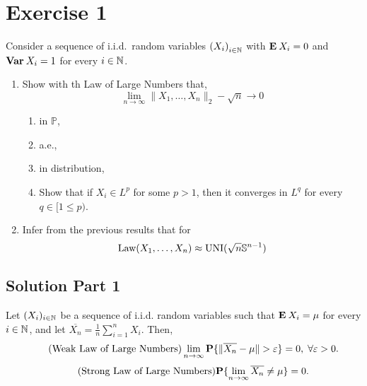 
\section{Exercise 1}
Consider a sequence of i.i.d.~random variables ${(X_i)}_{i\in\N}$ with $\E X_i = 0$ and $\Var X_i = 1$ for every $i\in \N$.

\begin{enumerate}
    \item Show with th Law of Large Numbers that,
    \[ \lim_{n\to\infty} \|X_1,\ldots,X_n\|_2 - \sqrt{n} \to 0 \]
    \begin{enumerate}[label=(\alph*)]
        \item in $\mathbb{P}$,
        \item a.e.,
        \item in distribution,
        \item Show that if $X_i \in L^p$ for some $p>1$, then it converges in $L^q$ for every $q \in [1\leq p)$.
    \end{enumerate} 
    \item Infer from the previous results that for
    \[ \text{Law}(X_1 , \ldots, X_n) \approx \text{UNI}(\sqrt{n} \S^{n-1}) \]
\end{enumerate}

\subsection*{Solution Part 1}

\begin{theorem}\label{loln}
Let $(X_i)_{i\in\N}$ be a sequence of i.i.d. random variables such that $\E X_i = \mu$ for every $i\in\N$, and let $\overline{X_n} = \frac{1}{n} \sum_{i = 1}^n X_i$. Then,
\begin{equation}\label{wloln}\tag{Weak Law of Large Numbers}
    \lim_{n\to\infty} \P\{\|\overline{X_n} - \mu\| > \varepsilon\} = 0,\;\forall \varepsilon > 0.
\end{equation}
\begin{equation}\label{sloln}\tag{Strong Law of Large Numbers}
    \P\{\lim_{n\to\infty} \overline{X_n} \neq \mu\} = 0.
\end{equation}
\end{theorem}

